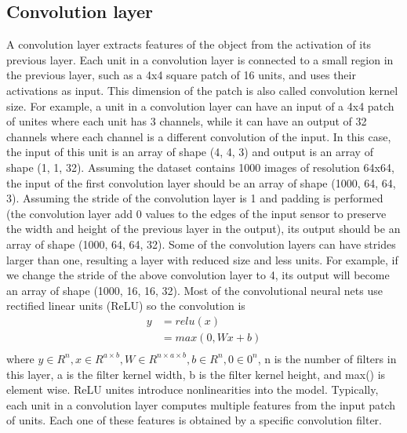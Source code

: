 \subsection{Convolution layer}
A convolution layer extracts features of the object from the activation of its previous layer.
Each unit in a convolution layer is connected to a small region in the previous layer, such as a 4x4 square patch of 16 units, and uses their activations as input.
This dimension of the patch is also called convolution kernel size.
For example, a unit in a convolution layer can have an input of a 4x4 patch of unites where each unit has 3 channels, while it can have an output of 32 channels where each channel is a different convolution of the input.
In this case, the input of this unit is an array of shape (4, 4, 3) and output is an array of shape (1, 1, 32).
Assuming the dataset contains 1000 images of resolution 64x64, the input of the first convolution layer should be an array of shape
(1000, 64, 64, 3).
Assuming the stride of the convolution layer is 1 and padding is performed (the convolution layer add 0 values to the edges of the input sensor to preserve the width and height of the previous layer in the output), its output should be an array of shape (1000, 64, 64, 32).
Some of the convolution layers can have strides larger than one, resulting a layer with reduced size and less units.
For example, if we change the stride of the above convolution layer to 4, its output will become an array of shape (1000, 16, 16, 32).
Most of the convolutional neural nets use rectified linear units (ReLU) so the convolution is
\begin{align*}
	y
	&= relu(x) \\
	&= max(0, Wx+b) \\
\end{align*}
where $ y \in R^n, x \in R^{a \times b}, W \in R^{n \times a \times b}, b \in R^n , 0 \in 0^n $, n is the number of filters in this layer, a is the filter kernel width, b is the filter kernel height, and max() is element wise.
ReLU unites introduce nonlinearities into the model.
Typically, each unit in a convolution layer computes multiple features from the input patch of units.
Each one of these features is obtained by a specific convolution filter.

